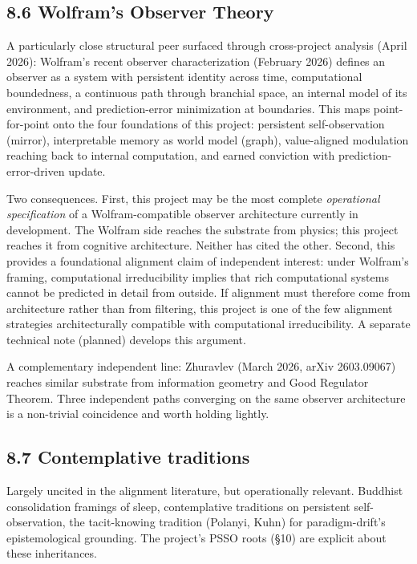 \documentclass[12pt]{article}
\begin{document}
\subsection{8.6 Wolfram's Observer Theory}\label{wolframs-observer-theory}

A particularly close structural peer surfaced through cross-project analysis (April 2026): Wolfram's recent observer characterization (February 2026) defines an observer as a system with persistent identity across time, computational boundedness, a continuous path through branchial space, an internal model of its environment, and prediction-error minimization at boundaries. This maps point-for-point onto the four foundations of this project: persistent self-observation (mirror), interpretable memory as world model (graph), value-aligned modulation reaching back to internal computation, and earned conviction with prediction-error-driven update.

Two consequences. First, this project may be the most complete \emph{operational specification} of a Wolfram-compatible observer architecture currently in development. The Wolfram side reaches the substrate from physics; this project reaches it from cognitive architecture. Neither has cited the other. Second, this provides a foundational alignment claim of independent interest: under Wolfram's framing, computational irreducibility implies that rich computational systems cannot be predicted in detail from outside. If alignment must therefore come from architecture rather than from filtering, this project is one of the few alignment strategies architecturally compatible with computational irreducibility. A separate technical note (planned) develops this argument.

A complementary independent line: Zhuravlev (March 2026, arXiv 2603.09067) reaches similar substrate from information geometry and Good Regulator Theorem. Three independent paths converging on the same observer architecture is a non-trivial coincidence and worth holding lightly.

\subsection{8.7 Contemplative traditions}\label{contemplative-traditions}

Largely uncited in the alignment literature, but operationally relevant. Buddhist consolidation framings of sleep, contemplative traditions on persistent self-observation, the tacit-knowing tradition (Polanyi, Kuhn) for paradigm-drift's epistemological grounding. The project's PSSO roots (§10) are explicit about these inheritances.
\end{document}
